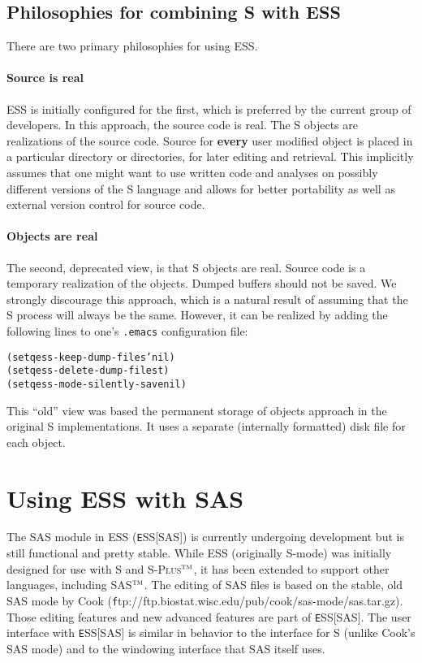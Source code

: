 \documentclass{article}
\newcommand*{\Splus}{\textsc{S-Plus}}
\newcommand{\tm}{$^{\mbox{\scriptsize\sc tm}}$}
\newenvironment{Salltt}{\small\begin{alltt}}{\end{alltt}}
\begin{document}
\subsection{Philosophies for combining S with ESS}
\label{sec:S:philosophy}

There are two primary philosophies for using ESS.   
\paragraph{Source is real}
ESS is initially
configured for the first, which is
preferred by the current group of developers.
In this approach, the source code is real.  The S objects
are realizations of the source code.  Source for \textbf{every} user
modified object is placed in a particular directory or directories,
for later editing and retrieval.  This implicitly assumes that one
might want to use written code and analyses on possibly different
versions of the S language and allows for better portability as well
as external version control for source code.

\paragraph{Objects are real}
The second, deprecated view, is that S objects are real.  Source code
is a temporary realization of the objects.  Dumped buffers
should not be saved.  We strongly discourage this approach, which is a
natural result of assuming that the S process will always be the same.
However, it can be realized by adding the following lines to one's
\texttt{.emacs} configuration file:
\begin{Salltt}
  (setq ess-keep-dump-files 'nil)
  (setq ess-delete-dump-files t)
  (setq ess-mode-silently-save nil)
\end{Salltt}
This ``old'' view was based the permanent storage of objects approach
in the original S implementations.  It uses a separate (internally formatted)
disk file for each object.


\section{Using ESS with SAS}
\label{sec:SAS}

The SAS module in ESS ({\texttt ESS[SAS]}) is currently undergoing
development but is still functional and pretty stable.  While ESS
(originally S-mode) was initially designed for use with S and
\Splus\tm, it has been extended to support other languages, including
SAS\tm.  The editing of SAS files is based on the stable, old SAS mode
by Cook ({\texttt
  ftp://ftp.biostat.wisc.edu/pub/cook/sas-mode/sas.tar.gz}).  Those
editing features and new advanced features are part of {\texttt ESS[SAS]}.
The user interface with {\texttt ESS[SAS]} is similar in behavior to the
interface for S (unlike Cook's SAS mode) and to the windowing
interface that SAS itself uses.
\end{document}
